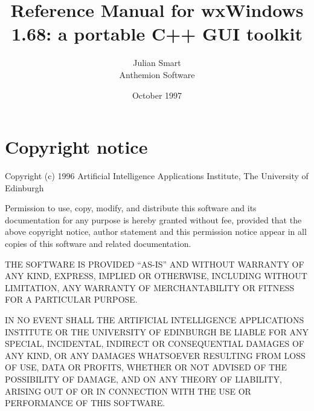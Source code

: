 \newcommand{\indexit}[1]{#1\index{#1}}
\newcommand{\pipe}[0]{$\|$\ }%



\parskip=10pt
\parindent=0pt
\title{Reference Manual for wxWindows 1.68: a portable C++ GUI toolkit}
\author{Julian Smart\\Anthemion Software}
\date{October 1997}

\makeindex

\maketitle

\pagestyle{fancyplain}

\setfooter{\thepage}{}{}{}{}{\thepage}
\tableofcontents


\chapter*{Copyright notice}
%
\setfooter{\thepage}{}{}{}{}{\thepage}

\begin{center}
Copyright (c) 1996 Artificial Intelligence Applications Institute,
The University of Edinburgh\\
\end{center}

Permission to use, copy, modify, and distribute this software and its
documentation for any purpose is hereby granted without fee, provided that the
above copyright notice, author statement and this permission notice appear in
all copies of this software and related documentation.

THE SOFTWARE IS PROVIDED ``AS-IS'' AND WITHOUT WARRANTY OF ANY KIND, EXPRESS,
IMPLIED OR OTHERWISE, INCLUDING WITHOUT LIMITATION, ANY WARRANTY OF
MERCHANTABILITY OR FITNESS FOR A PARTICULAR PURPOSE.

IN NO EVENT SHALL THE ARTIFICIAL INTELLIGENCE APPLICATIONS INSTITUTE OR THE
UNIVERSITY OF EDINBURGH BE LIABLE FOR ANY SPECIAL, INCIDENTAL, INDIRECT OR
CONSEQUENTIAL DAMAGES OF ANY KIND, OR ANY DAMAGES WHATSOEVER RESULTING FROM
LOSS OF USE, DATA OR PROFITS, WHETHER OR NOT ADVISED OF THE POSSIBILITY OF
DAMAGE, AND ON ANY THEORY OF LIABILITY, ARISING OUT OF OR IN CONNECTION WITH
THE USE OR PERFORMANCE OF THIS SOFTWARE.


